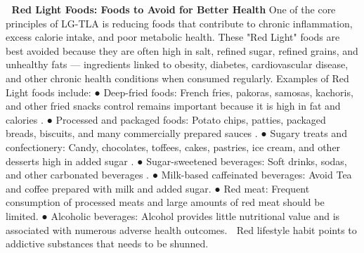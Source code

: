 \documentclass{article}
\begin{document}
🔴 \textbf{Red Light Foods: Foods to Avoid for Better Health} \cite{ICMR2024}
One of the core principles of LG-TLA is reducing foods that contribute to chronic inflammation, excess calorie intake, and poor metabolic health. These "Red Light" foods are best avoided because they are often high in salt, refined sugar, refined grains, and unhealthy fats — ingredients linked to obesity, diabetes, cardiovascular disease, and other chronic health conditions when consumed regularly.
Examples of Red Light foods include:
● Deep-fried foods: French fries, pakoras, samosas, kachoris, and other fried snacks control remains important because it is high in fat and calories \cite{Qin2021FriedHeart}.
● Processed and packaged foods: Potato chips, patties, packaged breads, biscuits, and many commercially prepared sauces \cite{Dai2024}.
● Sugary treats and confectionery: Candy, chocolates, toffees, cakes, pastries, ice cream, and other desserts high in added sugar \cite{LaraCastor2025SSB} .
● Sugar-sweetened beverages: Soft drinks, sodas, and other carbonated beverages \cite{Reynolds2019Fiber}.
● Milk-based caffeinated beverages: Avoid Tea and coffee prepared with milk and added sugar.
● Red meat: Frequent consumption of processed meats and large amounts of red meat should be limited. 
● Alcoholic beverages: Alcohol provides little nutritional value and is associated with numerous adverse health outcomes.
🔴 Red lifestyle habit points to addictive substances that needs to be shunned.
\end{document}

